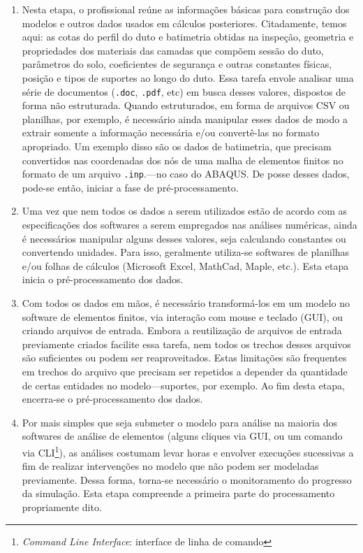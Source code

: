 \begin{enumerate}[label= (\arabic*)]
    \item Nesta etapa, o profissional reúne as informações básicas para construção dos modelos e outros dados usados em cálculos posteriores. Citadamente, temos aqui: as cotas do perfil do duto e batimetria obtidas na inspeção, geometria e propriedades dos materiais das camadas que compõem sessão do duto, parâmetros do solo, coeficientes de segurança e outras constantes físicas, posição e tipos de suportes ao longo do duto. Essa tarefa envole analisar uma série de documentos (\texttt{.doc}, \texttt{.pdf}, etc) em busca desses valores, dispostos de forma não estruturada. Quando estruturados, em forma de arquivos CSV ou planilhas, por exemplo, é necessário ainda manipular esses dados de modo a extrair somente a informação necessária e/ou convertê-las no formato apropriado. Um exemplo disso são os dados de batimetria, que precisam convertidos nas coordenadas dos nós de uma malha de elementos finitos no formato de um arquivo \texttt{.inp}.---no caso do ABAQUS. De posse desses dados, pode-se então, iniciar a fase de pré-processamento.
    \item Uma vez que nem todos os dados a serem utilizados estão de acordo com as especificações dos softwares a serem empregados nas análises numéricas, ainda é necessários manipular alguns desses valores, seja calculando constantes ou convertendo unidades. Para isso, geralmente utiliza-se softwares de planilhas e/ou folhas de cálculos (Microsoft Excel, MathCad, Maple, etc.). Esta etapa inicia o pré-processamento dos dados.
    \item Com todos os dados em mãos, é necessário transformá-los em um modelo no software de elementos finitos, via interação com mouse e teclado (GUI), ou criando arquivos de entrada. Embora a reutilização de arquivos de entrada previamente criados facilite essa tarefa, nem todos os trechos desses arquivos são suficientes ou podem ser reaproveitados. Estas limitações são frequentes em trechos do arquivo que precisam ser repetidos a depender da quantidade de certas entidades no modelo---suportes, por exemplo. Ao fim desta etapa, encerra-se o pré-processamento dos dados.
    \item Por mais simples que seja submeter o modelo para análise na maioria dos softwares de análise de elementos (alguns cliques via GUI, ou um comando via CLI\footnote{\textit{Command Line Interface}: interface de linha de comando}), as análises costumam levar horas e envolver execuções sucessivas a fim de realizar intervenções no modelo que não podem ser modeladas previamente. Dessa forma, torna-se necessário o monitoramento do progresso da simulação. Esta etapa compreende a primeira parte do processamento propriamente dito.

\end{enumerate}
